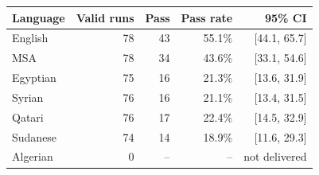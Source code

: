 \begin{tabular}{lrrrr}
\toprule
Language & Valid runs & Pass & Pass rate & 95\% CI \\
\midrule
English & 78 & 43 & 55.1\% & [44.1, 65.7] \\
MSA & 78 & 34 & 43.6\% & [33.1, 54.6] \\
Egyptian & 75 & 16 & 21.3\% & [13.6, 31.9] \\
Syrian & 76 & 16 & 21.1\% & [13.4, 31.5] \\
Qatari & 76 & 17 & 22.4\% & [14.5, 32.9] \\
Sudanese & 74 & 14 & 18.9\% & [11.6, 29.3] \\
Algerian & 0 & -- & -- & not delivered \\
\bottomrule
\end{tabular}
